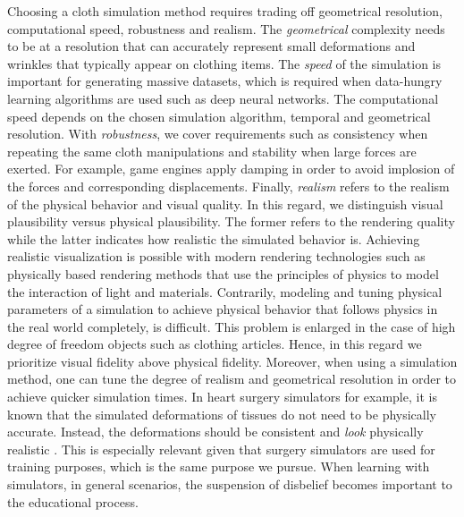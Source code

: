 \documentclass[\home/main.tex]{subfiles}
\begin{document}
Choosing a cloth simulation method requires trading off geometrical resolution, computational speed, robustness and realism. 
The \emph{geometrical} complexity needs to be at a resolution that can accurately represent small deformations and wrinkles that typically appear on clothing items. 
The \emph{speed} of the simulation is important for generating massive datasets, which is required when data-hungry learning algorithms are used such as deep neural networks. The computational speed depends on the chosen simulation algorithm, temporal and geometrical resolution. 
With \emph{robustness}, we cover requirements such as consistency when repeating the same cloth manipulations and stability when large forces are exerted. For example, game engines apply damping in order to avoid implosion of the forces and corresponding displacements. 
Finally, \emph{realism} refers to the realism of the physical behavior and visual quality. In this regard, we distinguish visual plausibility versus physical plausibility. The former refers to the rendering quality while the latter indicates how realistic the simulated behavior is. Achieving realistic visualization is possible with modern rendering technologies such as physically based rendering methods that use the principles of physics to model the interaction of light and materials. Contrarily, modeling and tuning physical parameters of a simulation to achieve physical behavior that follows physics in the real world completely, is difficult. This problem is enlarged in the case of high degree of freedom objects such as clothing articles. Hence, in this regard we prioritize visual fidelity above physical fidelity. Moreover, when using a simulation method, one can tune the degree of realism and geometrical resolution in order to achieve quicker simulation times. In heart surgery simulators for example, it is known that the simulated deformations of tissues do not need to be physically accurate. Instead, the deformations should be consistent and \emph{look} physically realistic \autocite{BroNielsen1998}. This is especially relevant given that surgery simulators are used for training purposes, which is the same purpose we pursue. When learning with simulators, in general scenarios, the suspension of disbelief becomes important to the educational process. 
\end{document}
